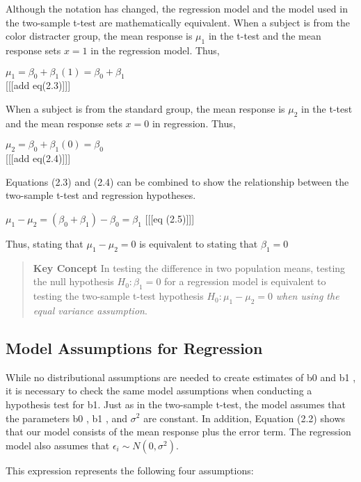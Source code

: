 \documentclass[
]{report}
\theoremstyle{definition}
\theoremstyle{definition}
\theoremstyle{definition}
\theoremstyle{definition}
\theoremstyle{remark}
\begin{document}
Although the notation has changed, the regression model and the model used in the two-sample t-test are mathematically equivalent. When a subject is from the color distracter group, the mean response is \(\mu_1\) in the t-test and the mean response sets \(x = 1\) in the regression model. Thus,

\(\mu_1 = \beta_0 + \beta_1(1) = \beta_0 + \beta_1\)\\
{[}{[}{[}add eq(2.3){]}{]}{]}

When a subject is from the standard group, the mean response is \(\mu_2\) in the t-test and the mean response sets \(x = 0\) in regression. Thus,

\(\mu_2 = \beta_0 + \beta_1(0) = \beta_0\)\\
{[}{[}{[}add eq(2.4){]}{]}{]}

Equations (2.3) and (2.4) can be combined to show the relationship between the two-sample t-test and regression hypotheses.

\(\mu_1 - \mu_2 = (\beta_0 + \beta_1) - \beta_0 = \beta_1\)
{[}{[}{[}eq (2.5){]}{]}{]}

Thus, stating that \(\mu_1 - \mu_2 = 0\) is equivalent to stating that \(\beta_1 = 0\)

\begin{quote}
\textbf{Key Concept}
In testing the difference in two population means, testing the null hypothesis \(H_0 : \beta_1 = 0\) for a regression model is equivalent to testing the two-sample t-test hypothesis \(H_0 : \mu_1 - \mu_2 = 0\) \emph{when using the equal variance assumption}.
\end{quote}

\hypertarget{model-assumptions-for-regression}{%
\subsection{Model Assumptions for Regression}\label{model-assumptions-for-regression}}

While no distributional assumptions are needed to create estimates of b0 and b1 , it is necessary to check the same model assumptions when conducting a hypothesis test for b1. Just as in the two-sample t-test, the model assumes that the parameters b0 , b1 , and \(\sigma^2\) are constant. In addition, Equation (2.2) shows that our model consists of the mean response plus the error term. The regression model also assumes that \(\epsilon_i \sim N(0,\sigma^2)\).

This expression represents the following four assumptions:
\end{document}
